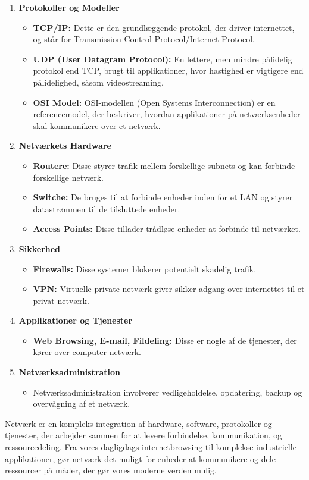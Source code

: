 \begin{enumerate}
\begin{figure}[!h]
	\end{figure}
	\item \textbf{Protokoller og Modeller}
	\begin{itemize}
		\item \textbf{TCP/IP:} Dette er den grundlæggende protokol, der driver internettet, og står for Transmission Control Protocol/Internet Protocol.
		\item \textbf{UDP (User Datagram Protocol):} En lettere, men mindre pålidelig protokol end TCP, brugt til applikationer, hvor hastighed er vigtigere end pålidelighed, såsom videostreaming.
		
		\item \textbf{OSI Model:} OSI-modellen (Open Systems Interconnection) er en referencemodel, der beskriver, hvordan applikationer på netværksenheder skal kommunikere over et netværk.
	\end{itemize}
	\item \textbf{Netværkets Hardware}
	\begin{itemize}
		\item \textbf{Routere:} Disse styrer trafik mellem forskellige subnets og kan forbinde forskellige netværk.
		\item \textbf{Switche:} De bruges til at forbinde enheder inden for et LAN og styrer datastrømmen til de tilsluttede enheder.
		\item \textbf{Access Points:} Disse tillader trådløse enheder at forbinde til netværket.
	\end{itemize}
	\item \textbf{Sikkerhed}
	\begin{itemize}
		\item \textbf{Firewalls:} Disse systemer blokerer potentielt skadelig trafik.
		\item \textbf{VPN:} Virtuelle private netværk giver sikker adgang over internettet til et privat netværk.
	\end{itemize}
	\item \textbf{Applikationer og Tjenester}
	\begin{itemize}
		\item \textbf{Web Browsing, E-mail, Fildeling:} Disse er nogle af de tjenester, der kører over computer netværk.
	\end{itemize}
	\item \textbf{Netværksadministration}
	\begin{itemize}
		\item Netværksadministration involverer vedligeholdelse, opdatering, backup og overvågning af et netværk.
	\end{itemize}
\end{enumerate}
Netværk er en kompleks integration af hardware, software, protokoller og tjenester, der arbejder sammen for at levere forbindelse, kommunikation, og ressourcedeling. Fra vores dagligdags internetbrowsing til komplekse industrielle applikationer, gør netværk det muligt for enheder at kommunikere og dele ressourcer på måder, der gør vores moderne verden mulig.
